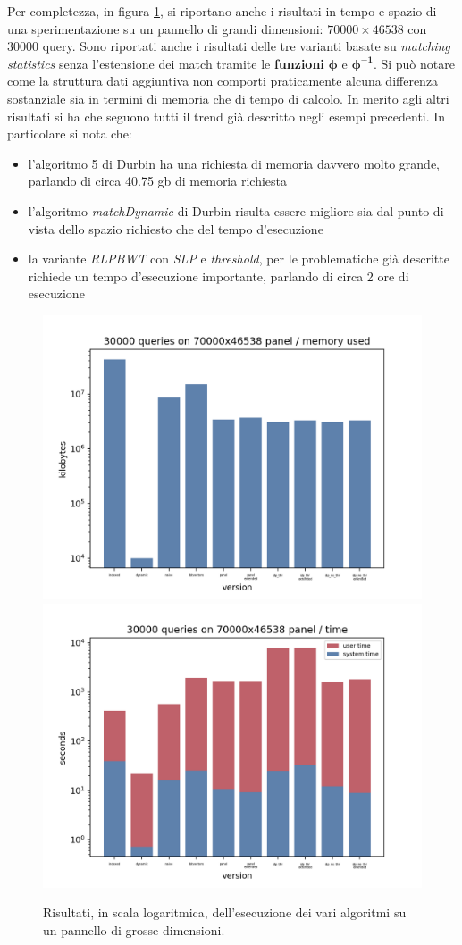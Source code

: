 Per completezza, in figura \ref{fig:bigres}, si riportano anche i risultati in tempo
e spazio di una sperimentazione su un pannello di grandi dimensioni:
$70000\times 46538$ con $30000$ query. Sono riportati anche i risultati delle
tre varianti basate su \textit{matching statistics} senza l'estensione dei match
tramite le \textbf{funzioni} $\boldsymbol \phi$ e
$\boldsymbol\phi^{\mathbf{-1}}$. Si può notare come la struttura dati aggiuntiva
non comporti praticamente alcuna differenza sostanziale sia in termini di
memoria che di tempo di calcolo. In merito agli altri risultati si ha che
seguono tutti il trend già descritto negli esempi precedenti. In particolare si
nota che:
\begin{itemize}
  \item l'algoritmo 5 di Durbin ha una richiesta di memoria davvero molto
  grande, parlando di circa 40.75 gb di memoria richiesta
  \item l'algoritmo \textit{matchDynamic} di Durbin risulta essere migliore sia
  dal punto di vista dello spazio richiesto che del tempo d'esecuzione
  \item la variante \textit{RLPBWT} con \textit{SLP} e \textit{threshold}, per
  le problematiche già descritte richiede un tempo d'esecuzione importante,
  parlando di circa 2 ore di esecuzione
\end{itemize}
\begin{figure}
  \centering
  \includegraphics[scale = 0.4]{img/mem.png}
  \includegraphics[scale = 0.4]{img/time.png}
  \caption{Risultati, in scala logaritmica, dell'esecuzione dei vari algoritmi
    su un pannello di grosse dimensioni.}
  \label{fig:bigres}
\end{figure}